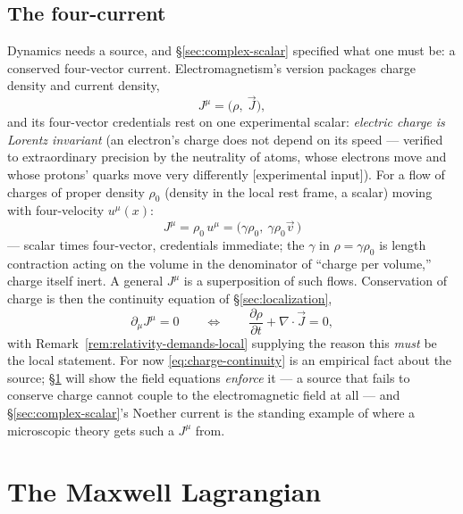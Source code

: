 \documentclass[11pt]{article}
\theoremstyle{plain}
\theoremstyle{definition}
\theoremstyle{remark}
\newcommand{\pd}[2]{\frac{\partial #1}{\partial #2}}
\begin{document}
\subsection{The four-current}
\label{sec:four-current}

Dynamics needs a source, and \S\ref{sec:complex-scalar} specified
what one must be: a conserved four-vector current. Electromagnetism's
version packages charge density and current density,
\begin{equation}
  J^\mu = \bigl(\rho,\ \vec J\bigr),
\end{equation}
and its four-vector credentials rest on one experimental scalar:
\emph{electric charge is Lorentz invariant} (an electron's charge
does not depend on its speed --- verified to extraordinary precision
by the neutrality of atoms, whose electrons move and whose protons'
quarks move very differently [experimental input]). For a flow of
charges of proper density $\rho_0$ (density in the local rest frame,
a scalar) moving with four-velocity $u^\mu(x)$:
\begin{equation}
  J^\mu = \rho_0\, u^\mu
  = \bigl(\gamma\rho_0,\ \gamma\rho_0\vec v\,\bigr)
  \label{eq:convective-current}
\end{equation}
--- scalar times four-vector, credentials immediate; the $\gamma$ in
$\rho = \gamma\rho_0$ is length contraction acting on the volume in
the denominator of ``charge per volume,'' charge itself inert. A
general $J^\mu$ is a superposition of such flows. Conservation of
charge is then the continuity equation of \S\ref{sec:localization},
\begin{equation}
  \boxed{\;
  \partial_\mu J^\mu = 0
  \qquad\Longleftrightarrow\qquad
  \pd{\rho}{t} + \nabla\cdot\vec J = 0,
  \;}
  \label{eq:charge-continuity}
\end{equation}
with Remark~\ref{rem:relativity-demands-local} supplying the reason
this \emph{must} be the local statement. For now
\eqref{eq:charge-continuity} is an empirical fact about the source;
\S\ref{sec:maxwell-lagrangian} will show the field equations
\emph{enforce} it --- a source that fails to conserve charge cannot
couple to the electromagnetic field at all --- and
\S\ref{sec:complex-scalar}'s Noether current is the standing example
of where a microscopic theory gets such a $J^\mu$ from.

\section{The Maxwell Lagrangian}
\label{sec:maxwell-lagrangian}
\end{document}
